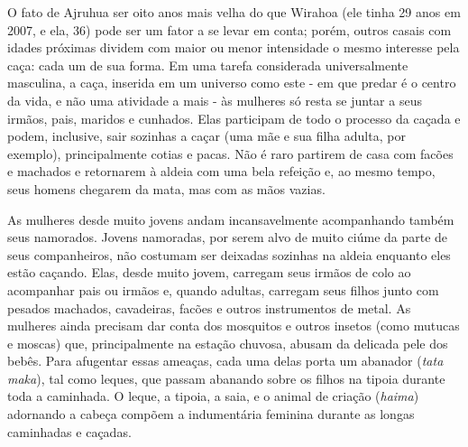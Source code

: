 O fato de Ajruhua ser oito anos mais velha do que Wirahoa (ele tinha 29
anos em 2007, e ela, 36) pode ser um fator a se levar em conta; porém,
outros casais com idades próximas dividem com maior ou menor intensidade
o mesmo interesse pela caça: cada um de sua forma. Em uma tarefa
considerada universalmente masculina, a caça, inserida em um universo
como este - em que predar é o centro da vida, e não uma atividade a mais
- às mulheres só resta se juntar a seus irmãos, pais, maridos e
cunhados. Elas participam de todo o processo da caçada e podem,
inclusive, sair sozinhas a caçar (uma mãe e sua filha adulta, por
exemplo), principalmente cotias e pacas. Não é raro partirem de casa com
facões e machados e retornarem à aldeia com uma bela refeição e, ao
mesmo tempo, seus homens chegarem da mata, mas com as mãos vazias.

As mulheres desde muito jovens andam incansavelmente acompanhando também
seus namorados. Jovens namoradas, por serem alvo de muito ciúme da parte
de seus companheiros, não costumam ser deixadas sozinhas na aldeia
enquanto eles estão caçando. Elas, desde muito jovem, carregam seus
irmãos de colo ao acompanhar pais ou irmãos e, quando adultas, carregam
seus filhos junto com pesados machados, cavadeiras, facões e outros
instrumentos de metal. As mulheres ainda precisam dar conta dos
mosquitos e outros insetos (como mutucas e moscas) que, principalmente
na estação chuvosa, abusam da delicada pele dos bebês. Para afugentar
essas ameaças, cada uma delas porta um abanador (\emph{tata maka}), tal
como leques, que passam abanando sobre os filhos na tipoia durante toda
a caminhada. O leque, a tipoia, a saia, e o animal de criação
(\emph{haima}) adornando a cabeça compõem a indumentária feminina
durante as longas caminhadas e caçadas.


